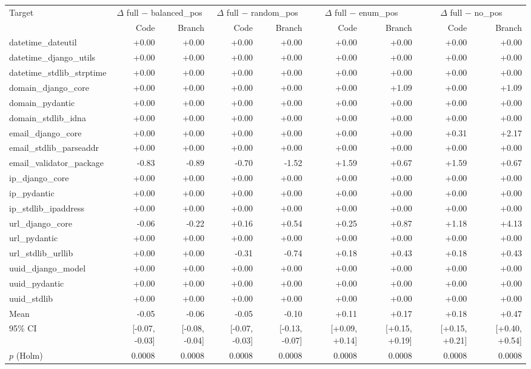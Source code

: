\begin{tabular}{lrrrrrrrr}
\toprule
Target & \multicolumn{2}{c}{$\Delta$ full $-$ balanced\_pos} & \multicolumn{2}{c}{$\Delta$ full $-$ random\_pos} & \multicolumn{2}{c}{$\Delta$ full $-$ enum\_pos} & \multicolumn{2}{c}{$\Delta$ full $-$ no\_pos} \\
 & Code & Branch & Code & Branch & Code & Branch & Code & Branch \\
\midrule
datetime\_dateutil & +0.00 & +0.00 & +0.00 & +0.00 & +0.00 & +0.00 & +0.00 & +0.00 \\
datetime\_django\_utils & +0.00 & +0.00 & +0.00 & +0.00 & +0.00 & +0.00 & +0.00 & +0.00 \\
datetime\_stdlib\_strptime & +0.00 & +0.00 & +0.00 & +0.00 & +0.00 & +0.00 & +0.00 & +0.00 \\
domain\_django\_core & +0.00 & +0.00 & +0.00 & +0.00 & +0.00 & +1.09 & +0.00 & +1.09 \\
domain\_pydantic & +0.00 & +0.00 & +0.00 & +0.00 & +0.00 & +0.00 & +0.00 & +0.00 \\
domain\_stdlib\_idna & +0.00 & +0.00 & +0.00 & +0.00 & +0.00 & +0.00 & +0.00 & +0.00 \\
email\_django\_core & +0.00 & +0.00 & +0.00 & +0.00 & +0.00 & +0.00 & +0.31 & +2.17 \\
email\_stdlib\_parseaddr & +0.00 & +0.00 & +0.00 & +0.00 & +0.00 & +0.00 & +0.00 & +0.00 \\
email\_validator\_package & -0.83 & -0.89 & -0.70 & -1.52 & +1.59 & +0.67 & +1.59 & +0.67 \\
ip\_django\_core & +0.00 & +0.00 & +0.00 & +0.00 & +0.00 & +0.00 & +0.00 & +0.00 \\
ip\_pydantic & +0.00 & +0.00 & +0.00 & +0.00 & +0.00 & +0.00 & +0.00 & +0.00 \\
ip\_stdlib\_ipaddress & +0.00 & +0.00 & +0.00 & +0.00 & +0.00 & +0.00 & +0.00 & +0.00 \\
url\_django\_core & -0.06 & -0.22 & +0.16 & +0.54 & +0.25 & +0.87 & +1.18 & +4.13 \\
url\_pydantic & +0.00 & +0.00 & +0.00 & +0.00 & +0.00 & +0.00 & +0.00 & +0.00 \\
url\_stdlib\_urllib & +0.00 & +0.00 & -0.31 & -0.74 & +0.18 & +0.43 & +0.18 & +0.43 \\
uuid\_django\_model & +0.00 & +0.00 & +0.00 & +0.00 & +0.00 & +0.00 & +0.00 & +0.00 \\
uuid\_pydantic & +0.00 & +0.00 & +0.00 & +0.00 & +0.00 & +0.00 & +0.00 & +0.00 \\
uuid\_stdlib & +0.00 & +0.00 & +0.00 & +0.00 & +0.00 & +0.00 & +0.00 & +0.00 \\
\midrule
Mean & -0.05 & -0.06 & -0.05 & -0.10 & +0.11 & +0.17 & +0.18 & +0.47 \\
95\% CI & [-0.07, -0.03] & [-0.08, -0.04] & [-0.07, -0.03] & [-0.13, -0.07] & [+0.09, +0.14] & [+0.15, +0.19] & [+0.15, +0.21] & [+0.40, +0.54] \\
$p$ (Holm) & 0.0008 & 0.0008 & 0.0008 & 0.0008 & 0.0008 & 0.0008 & 0.0008 & 0.0008 \\
\bottomrule
\end{tabular}
